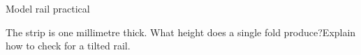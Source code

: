 \documentclass{exam}
\begin{document}
\begin{center}\Large Model rail practical\end{center}
\begin{questions}\question[2] The strip is one millimetre thick. What height does a single fold produce?\fillwithlines{18mm}\question[3] Explain how to check for a tilted rail.\fillwithlines{25mm}\end{questions}\gradetable[h]
\end{document}
